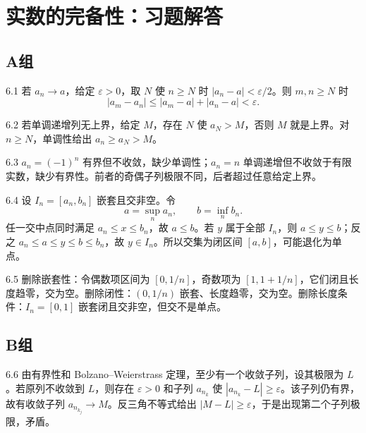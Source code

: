 \chapter{实数的完备性：习题解答}

\section*{A组}

\begin{solution}{6.1}
若 \(a_n\to a\)，给定 \(\varepsilon>0\)，取 \(N\) 使 \(n\ge N\) 时 \(|a_n-a|<\varepsilon/2\)。则 \(m,n\ge N\) 时
\[
 |a_m-a_n|\le|a_m-a|+|a_n-a|<\varepsilon.
\]
\end{solution}

\begin{solution}{6.2}
若单调递增列无上界，给定 \(M\)，存在 \(N\) 使 \(a_N>M\)，否则 \(M\) 就是上界。对 \(n\ge N\)，单调性给出 \(a_n\ge a_N>M\)。
\end{solution}

\begin{solution}{6.3}
\(a_n=(-1)^n\) 有界但不收敛，缺少单调性；\(a_n=n\) 单调递增但不收敛于有限实数，缺少有界性。前者的奇偶子列极限不同，后者超过任意给定上界。
\end{solution}

\begin{solution}{6.4}
设 \(I_n=[a_n,b_n]\) 嵌套且交非空。令
\[
 a=\sup_n a_n,\qquad b=\inf_n b_n.
\]
任一交中点同时满足 \(a_n\le x\le b_n\)，故 \(a\le b\)。若 \(y\) 属于全部 \(I_n\)，则 \(a\le y\le b\)；反之 \(a_n\le a\le y\le b\le b_n\)，故 \(y\in I_n\)。所以交集为闭区间 \([a,b]\)，可能退化为单点。
\end{solution}

\begin{solution}{6.5}
删除嵌套性：令偶数项区间为 \([0,1/n]\)，奇数项为 \([1,1+1/n]\)，它们闭且长度趋零，交为空。删除闭性：\((0,1/n)\) 嵌套、长度趋零，交为空。删除长度条件：\(I_n=[0,1]\) 嵌套闭且交非空，但交不是单点。
\end{solution}

\section*{B组}

\begin{solution}{6.6}
由有界性和 Bolzano--Weierstrass 定理，至少有一个收敛子列，设其极限为 \(L\)。若原列不收敛到 \(L\)，则存在 \(\varepsilon>0\) 和子列 \(a_{n_k}\) 使 \(|a_{n_k}-L|\ge\varepsilon\)。该子列仍有界，故有收敛子列 \(a_{n_{k_j}}\to M\)。反三角不等式给出 \(|M-L|\ge\varepsilon\)，于是出现第二个子列极限，矛盾。
\end{solution}

